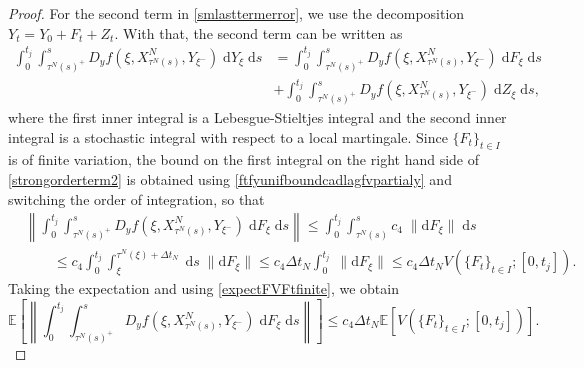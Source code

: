 \documentclass[reqno,12pt]{amsart}
\theoremstyle{plain} %
\theoremstyle{definition} %
\begin{document}
\begin{proof}
    For the second term in \cref{smlasttermerror}, we use the decomposition $Y_t = Y_0 + F_t + Z_t.$ With that, the second term can be written as
    \begin{equation}
        \begin{aligned}
            \label{strongorderterm2}
            \int_0^{t_j} \int_{\tau^N(s)^+}^s D_y f(\xi, X_{\tau^N(s)}^N, Y_{\xi^-}) \;\mathrm{d}Y_\xi \;\mathrm{d}s & = \int_0^{t_j} \int_{\tau^N(s)^+}^s D_y f(\xi, X_{\tau^N(s)}^N, Y_{\xi^-}) \;\mathrm{d}F_\xi \;\mathrm{d}s \\  
            & + \int_0^{t_j} \int_{\tau^N(s)^+}^s D_y f(\xi, X_{\tau^N(s)}^N, Y_{\xi^-}) \;\mathrm{d}Z_\xi \;\mathrm{d}s,
        \end{aligned}
    \end{equation}
    where the first inner integral is a Lebesgue-Stieltjes integral and the second inner integral is a stochastic integral with respect to a local martingale. Since $\{F_t\}_{t\in I}$ is of finite variation, the bound on the first integral on the right hand side of \cref{strongorderterm2} is obtained using \cref{ftfyunifboundcadlagfvpartialy} and switching the order of integration, so that
    \begin{align*}
        & \left\|\int_0^{t_j} \int_{\tau^N(s)^+}^s D_y f(\xi, X_{\tau^N(s)}^N, Y_{\xi^-}) \;\mathrm{d}F_\xi\;\mathrm{d}s\right\| \leq \int_0^{t_j} \int_{\tau^N(s)}^s c_4\;\|\mathrm{d}F_\xi\|\;\mathrm{d}s \\
        & \qquad \leq c_4\int_0^{t_j} \int_{\xi}^{\tau^N(\xi) + \Delta t_N} \;\mathrm{d}s\;\|\mathrm{d}F_\xi\|  \leq c_4\Delta t_N\int_0^{t_j} \;\|\mathrm{d}F_\xi\| \leq c_4\Delta t_N V(\{F_t\}_{t\in I}; [0, t_j]).
    \end{align*}
    Taking the expectation and using \cref{expectFVFtfinite}, we obtain
    \begin{equation}
        \label{strongorderterm2a}
        \mathbb{E}\left[\left\|\int_0^{t_j} \int_{\tau^N(s)^+}^s D_y f(\xi, X_{\tau^N(s)}^N, Y_{\xi^-}) \;\mathrm{d}F_\xi\;\mathrm{d}s\right\|\right] \leq c_4 \Delta t_N \mathbb{E}\left[ V(\{F_t\}_{t\in I}; [0, t_j]) \right].
    \end{equation}
    

\end{proof}
\end{document}
